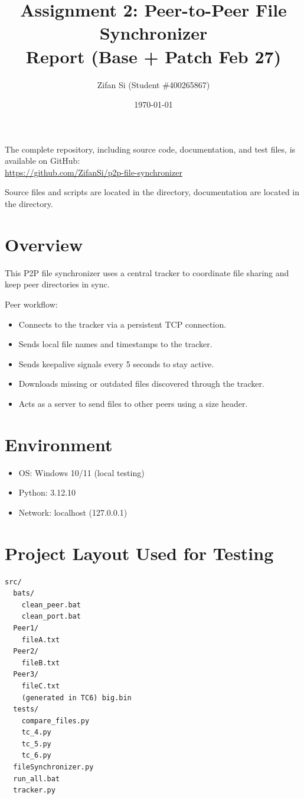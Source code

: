 \documentclass[11pt]{article}
\title{Assignment 2: Peer-to-Peer File Synchronizer\\Report (Base + Patch Feb 27)}
\author{Zifan Si \quad (Student \#400265867)}
\date{\today}
\begin{document}
\maketitle

\noindent The complete repository, including source code, documentation, and test files, is available on GitHub: \\
{\Large \color{blue} \url{https://github.com/ZifanSi/p2p-file-synchronizer}}

\vspace{0.5em}
\noindent Source files and scripts are located in the  directory, documentation are located in the  directory.


\section{Overview}
This P2P file synchronizer uses a central tracker to coordinate file sharing and keep peer directories in sync.

Peer workflow:
\begin{itemize}[noitemsep]
\item Connects to the tracker via a persistent TCP connection.
\item Sends local file names and timestamps to the tracker.
\item Sends keepalive signals every 5 seconds to stay active.
\item Downloads missing or outdated files discovered through the tracker.
\item Acts as a server to send files to other peers using a size header.
\end{itemize}

\section{Environment}
\begin{itemize}[noitemsep]
  \item OS: Windows 10/11 (local testing)
  \item Python: 3.12.10
  \item Network: localhost (127.0.0.1)
\end{itemize}

\section{Project Layout Used for Testing}
\begin{lstlisting}
src/
  bats/
    clean_peer.bat
    clean_port.bat
  Peer1/
    fileA.txt
  Peer2/
    fileB.txt
  Peer3/
    fileC.txt
    (generated in TC6) big.bin
  tests/
    compare_files.py
    tc_4.py
    tc_5.py
    tc_6.py
  fileSynchronizer.py
  run_all.bat
  tracker.py
\end{lstlisting}
\end{document}
